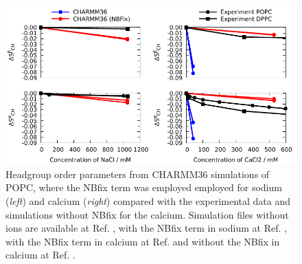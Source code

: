 \documentclass[journal=jpcbfk]{achemso}
\begin{document}
\begin{figure}[]
  \centering
  \includegraphics[width=17.0cm]{../Figs/OP_CHARMM_CaCl_POPC_NBFix.pdf}
  \caption{\label{OP_CHARMM_CaCl_POPC_NBFix}
    Headgroup order parameters from CHARMM36 simulations of POPC, where the NBfix term was employed employed for sodium \cite{venable13} ({\it left})
    and calcium \cite{kim16} ({\it right}) compared with the experimental data \cite{akutsu81,altenbach84}
    and simulations without NBfix for the calcium.
    Simulation files without ions are available at Ref. ,
    with the NBfix term in sodium at Ref. , 
    with the NBfix term in calcium at Ref.  and
    without the NBfix in calcium at Ref. .
  }
\end{figure}
\end{document}

